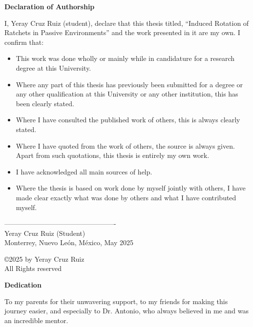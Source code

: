 \begin{center}
\bf{Declaration of Authorship}
\end{center}

I, Yeray Cruz Ruiz (student), declare that this thesis titled, \enquote{Induced Rotation of Ratchets in Passive Environments} and the work presented in it are my own. I confirm that:

\begin{itemize}
  \item This work was done wholly or mainly while in candidature for a research degree at this University.
  \item Where any part of this thesis has previously been submitted for a degree or any other qualification at this University or any other institution, this has been clearly stated.
  \item Where I have consulted the published work of others, this is always clearly stated.
  \item Where I have quoted from the work of others, the source is always given. Apart from such quotations, this thesis is entirely my own work.
  \item I have acknowledged all main sources of help.
  \item Where the thesis is based on work done by myself jointly with others, I have made clear exactly what was done by others and what I have contributed myself.
\end{itemize}

\vspace{5em}

\begin{flushright}
{-------------------------------------------------} \\
Yeray Cruz Ruiz (Student) \\
Monterrey, Nuevo León, México, May 2025
\end{flushright}

\vfill
\begin{center}
\large {\copyright 2025 by Yeray Cruz Ruiz}\\
\large{All Rights reserved}
\end{center}


\newpage %

\Huge {\bf Dedication}

\vfill
\normalsize To my parents for their unwavering support, to my friends for making this journey easier, and especially to Dr. Antonio, who always believed in me and was an incredible mentor. 
\vfill


